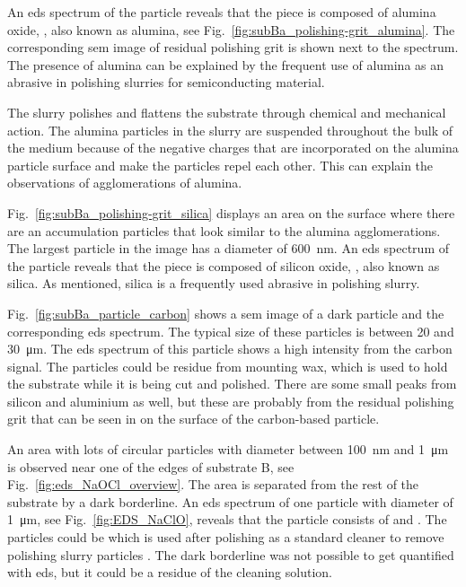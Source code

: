 An \ac{eds} spectrum of the particle reveals that the piece is composed of alumina oxide, , also known as alumina, see Fig.~\ref{fig:subBa_polishing-grit_alumina}. The corresponding \ac{sem} image of residual polishing grit is shown next to the spectrum. The presence of alumina can be explained by the frequent use of alumina as an abrasive in polishing slurries for semiconducting material.

The slurry polishes and flattens the substrate through chemical and mechanical action. The alumina particles in the slurry are suspended throughout the bulk of the medium because of the negative charges that are incorporated on the alumina particle surface and make the particles repel each other. This can explain the observations of agglomerations of alumina. 

Fig.~\ref{fig:subBa_polishing-grit_silica} displays an area on the surface where there are an accumulation particles that look similar to the alumina agglomerations. The largest particle in the image has a diameter of \SI{600}{\nano\metre}. An \ac{eds} spectrum of the particle reveals that the piece is composed of silicon oxide, , also known as silica. As mentioned, silica is a frequently used abrasive in polishing slurry.

Fig.~\ref{fig:subBa_particle_carbon} shows a \ac{sem} image of a dark particle and the corresponding \ac{eds} spectrum. The typical size of these particles is between \SI{20}{} and \SI{30}{\micro\metre}. The \ac{eds} spectrum of this particle shows a high intensity from the carbon signal. The particles could be residue from mounting wax, which is used to hold the substrate while it is being cut and polished. There are some small peaks from silicon and aluminium as well, but these are probably from the residual polishing grit that can be seen in on the surface of the carbon-based particle.

An area with lots of circular particles with diameter between \SI{100}{\nano\metre} and \SI{1}{\micro\metre} is observed near one of the edges of substrate B, see Fig.~\ref{fig:eds_NaOCl_overview}. The area is separated from the rest of the substrate by a dark borderline. An \ac{eds} spectrum of one particle with diameter of \SI{1}{\micro\metre}, see Fig.~\ref{fig:EDS_NaClO}, reveals that the particle consists of  and . The particles could be  which is used after polishing as a standard cleaner to remove polishing slurry particles \citep{benson2015as-received}. The dark borderline was not possible to get quantified with \ac{eds}, but it could be a residue of the cleaning solution.

